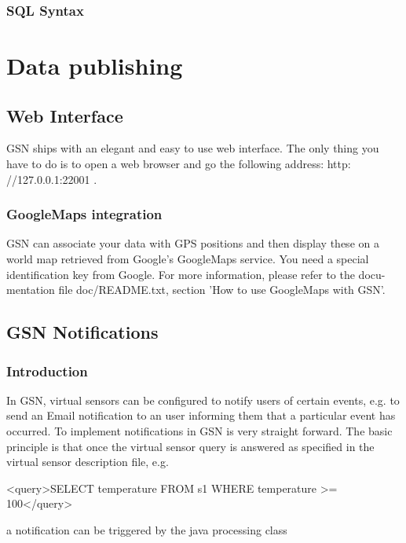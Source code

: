 \subsubsection{SQL Syntax}

\section{Data publishing}

\subsection{Web Interface}

GSN ships with an elegant and easy to use web interface. The only thing
you have to do is to open a web browser and go the following address: http:
//127.0.0.1:22001 .

\subsubsection{GoogleMaps integration}
GSN can associate your data with GPS positions and then display these on
a world map retrieved from Google's GoogleMaps service. You need a special
identification key from Google. For more information, please refer to the docu-
mentation file doc/README.txt, section 'How to use GoogleMaps with GSN'.

\subsection{GSN Notifications}

\subsubsection{Introduction}

In GSN, virtual sensors can be configured to notify users of certain events, e.g. to send an Email notification to an user informing them that a particular event has occurred. To implement notifications in GSN is very straight forward. The basic principle is that once the virtual sensor query is answered as specified in the virtual sensor description file, e.g.

\begin{xmlcode}
<query>SELECT temperature FROM s1 WHERE temperature >= 100</query>
\end{xmlcode}

a notification can be triggered  by the java processing class

